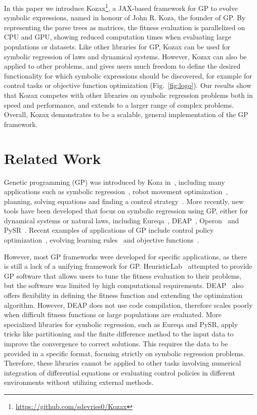 \documentclass{article}
\begin{document}
In this paper we introduce Kozax\footnote{\url{https://github.com/sdevries0/Kozax}}, a JAX-based framework for GP to evolve symbolic expressions, named in honour of John R. Koza, the founder of GP. By representing the parse trees as matrices, the fitness evaluation is parallelized on CPU and GPU, showing reduced computation times when evaluating large populations or datasets. Like other libraries for GP, Kozax can be used for symbolic regression of laws and dynamical systems. However, Kozax can also be applied to other problems, and gives users much freedom to define the desired functionality for which symbolic expressions should be discovered, for example for control tasks or objective function optimization (Fig.~\ref{fig:logo}). Our results show that Kozax competes with other libraries on symbolic regression problems both in speed and performance, and extends to a larger range of complex problems. Overall, Kozax demonstrates to be a scalable, general implementation of the GP framework.

\section{Related Work}
Genetic programming (GP) was introduced by Koza in~\cite{koza1994genetic}, including many applications such as symbolic regression~\cite{koza1994genetic}, robot movement optimization~\cite{koza1992automatic}, planning, solving equations and finding a control strategy~\cite{koza1990genetic}. More recently, new tools have been developed that focus on symbolic regression using GP, either for dynamical systems or natural laws, including Eureqa~\cite{bongard2007automated, schmidt2009distilling}, DEAP~\cite{fortin2012deap}, Operon~\cite{burlacu2020operon} and PySR~\cite{cranmer2023interpretable}. Recent examples of applications of GP include control policy optimization~\cite{hein2018interpretable,vries2024discovering,nadizar2024naturally}, evolving learning rules~\cite{jordan2021evolving, bengio1994use} and objective functions~\cite{raymond2023fast}.

However, most GP frameworks were developed for specific applications, as there is still a lack of a unifying framework for GP. HeuristicLab~\cite{wagner2005heuristiclab} attempted to provide GP software that allows users to tune the fitness evaluation to their problems, but the software was limited by high computational requirements. DEAP~\cite{fortin2012deap} also offers flexibility in defining the fitness function and extending the optimization algorithm. However, DEAP does not use code compilation, therefore scales poorly when difficult fitness functions or large populations are evaluated. More specialized libraries for symbolic regression, such as Eureqa and PySR, apply tricks like partitioning and the finite difference method to the input data to improve the convergence to correct solutions. This requires the data to be provided in a specific format, focusing strictly on symbolic regression problems. Therefore, these libraries cannot be applied to other tasks involving numerical integration of differential equations or evaluating control policies in different environments without utilizing external methods. 
\end{document}
